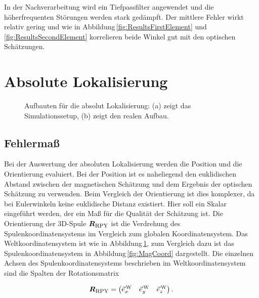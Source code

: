 In der Nachverarbeitung wird ein Tiefpassfilter angewendet und die höherfrequenten Störungen werden stark gedämpft. Der mittlere Fehler wirkt relativ gering und wie in Abbildung\,\ref{fig:ResultsFirstElement} und \ref{fig:ResultsSecondElement} korrelieren beide Winkel gut mit den optischen Schätzungen. 

  
\section{Absolute Lokalisierung}

\begin{figure}[h]
  \centering
  \caption{Aufbauten für die absolut Lokalisierung: (a) zeigt das Simulationssetup, (b) zeigt den realen Aufbau.}
  \label{fig:AbsSetup}
\end{figure}

\subsection{Fehlermaß}
Bei der Auswertung der absoluten Lokalisierung werden die Position und die Orientierung evaluiert. Bei der Position ist es naheliegend den euklidischen Abstand zwischen der magnetischen Schätzung und dem Ergebnis der optischen Schätzung zu verwenden. Beim Vergleich der Orientierung ist dies komplexer, da bei Eulerwinkeln keine euklidische Distanz existiert. Hier soll ein Skalar eingeführt werden, der ein Maß für die Qualität der Schätzung ist. 
Die Orientierung der 3D-Spule $\mbox{\boldmath ${R}$}_{\textrm{\footnotesize{RPY}}}$ ist die Verdrehung des Spulenkoordinatensystems im Vergleich zum globalen Koordinatensystem. Das Weltkoordinatensystem ist wie in Abbildung\,\ref{fig:AbsSetup}, zum Vergleich dazu ist das Spulenkoordinatensystem in Abbildung\,\ref{fig:MagCoord} dargestellt. Die einzelnen Achsen des Spulenkoordinatensystems beschrieben im Weltkoordinatensystem sind die Spalten der Rotationsmatrix

\begin{equation}
    \mbox{\boldmath ${R}$}_{\textrm{\footnotesize{RPY}}} = \begin{pmatrix}
        \vec{e}_x^{\,\text{W}} & \vec{e}_y^{\,\text{W}} & \vec{e}_z^{\,\text{W}}
    \end{pmatrix}.
\end{equation}

